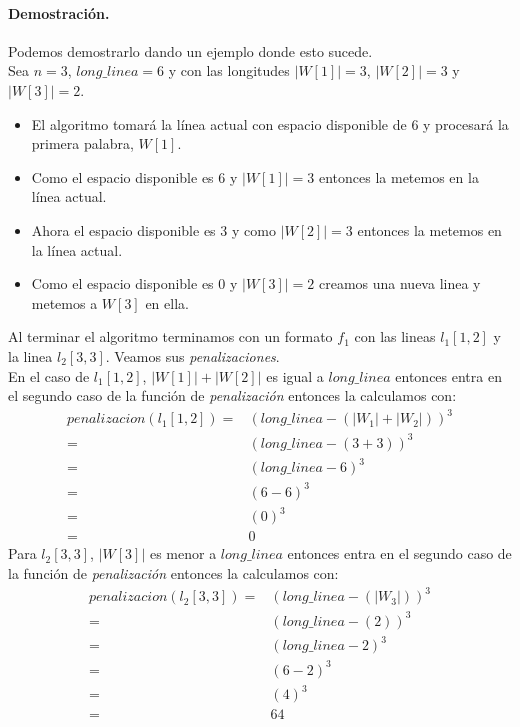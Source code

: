 \documentclass[12pt]{article}
\begin{document}
	 \paragraph{Demostración.} Podemos demostrarlo dando un ejemplo donde esto sucede.\\
	 Sea $n=3$, $long\_linea=6$ y con las longitudes 
	 $|W[1]|=3$, $|W[2]|=3$ y  $|W[3]|=2$.\\
	 \begin{itemize}
	 	\item El algoritmo tomará la línea actual con espacio disponible de $6$ y procesará la primera palabra, $W[1]$.
	 	\item Como el espacio disponible es $6$ y $|W[1]|=3$ entonces la metemos en la línea actual.
	 	\item Ahora el espacio disponible es $3$ y como $|W[2]|=3$ entonces la metemos en la línea actual.
	 	\item Como el espacio disponible es $0$ y $|W[3]|=2$ creamos una nueva linea y metemos a $W[3]$ en ella.
	 \end{itemize}
 	Al terminar el algoritmo terminamos con un formato $f_1$ con las lineas $l_1[1,2]$ y la linea $l_2[3, 3]$. Veamos sus \textit{penalizaciones}.\\
 	En el caso de $l_1[1,2]$, $|W[1]|+|W[2]|$ es igual a $long\_linea$ entonces entra en el segundo caso de la función de \textit{penalización} entonces la calculamos con: 
 	\begin{equation}
 		\begin{split}
 		\textit{penalizacion}(l_1[1,2])= & (long\_linea - (|W_1| + |W_2|))^3 \\
 		 = & (long\_linea - (3 + 3))^3 \\
 		 = & (long\_linea - 6)^3\\
 		 = & (6 - 6)^3\\
 		 = & (0)^3 \\
 		 = & 0
 		\end{split}
 	\end{equation}
	Para $l_2[3,3]$, $|W[3]|$ es menor a $long\_linea$ entonces entra en el segundo caso de la función de \textit{penalización} entonces la calculamos con: 
	\begin{equation}
	\begin{split}
	\textit{penalizacion}(l_2[3,3])= & (long\_linea - (|W_3|))^3 \\
	= & (long\_linea - (2))^3 \\
	= & (long\_linea - 2)^3\\
	= & (6 - 2)^3\\
	= & (4)^3 \\
	= & 64
	\end{split}
	\end{equation}
\end{document}
